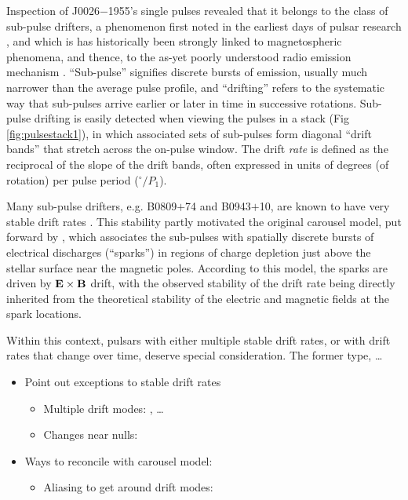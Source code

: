 \documentclass[twocolumn]{aastex631}
\newcommand{\psr}{J0026$-$1955}
\newcommand{\ExB}{\ensuremath{{\bf E}\times{\bf B}}}
\begin{document}
Inspection of \psr{}'s single pulses revealed that it belongs to the class of sub-pulse drifters, a phenomenon first noted in the earliest days of pulsar research \citep{Drake1968}, and which is has historically been strongly linked to magnetospheric phenomena, and thence, to the as-yet poorly understood radio emission mechanism \citep{Ruderman1975,Rankin1986,Deshpande1999}.
``Sub-pulse'' signifies discrete bursts of emission, usually much narrower than the average pulse profile, and ``drifting'' refers to the systematic way that sub-pulses arrive earlier or later in time in successive rotations.
Sub-pulse drifting is easily detected when viewing the pulses in a stack (Fig \ref{fig:pulsestack1}), in which associated sets of sub-pulses form diagonal ``drift bands'' that stretch across the on-pulse window.
The drift \textit{rate} is defined as the reciprocal of the slope of the drift bands, often expressed in units of degrees (of rotation) per pulse period ($^\circ/P_1$).

Many sub-pulse drifters, e.g. B0809$+$74 and B0943$+$10, are known to have very stable drift rates \citep[e.g.][]{Taylor1971,Deshpande1999}.
This stability partly motivated the original carousel model, put forward by \citet{Ruderman1975}, which associates the sub-pulses with spatially discrete bursts of electrical discharges (``sparks'') in regions of charge depletion just above the stellar surface near the magnetic poles.
According to this model, the sparks are driven by \ExB{} drift, with the observed stability of the drift rate being directly inherited from the theoretical stability of the electric and magnetic fields at the spark locations.

Within this context, pulsars with either multiple stable drift rates, or with drift rates that change over time, deserve special consideration.
The former type, \dots

\begin{itemize}
    \item Point out exceptions to stable drift rates
    \begin{itemize}
        \item Multiple drift modes: \citep{Hankins1987}, \dots
        \item Changes near nulls: \citep{Lyne1983,VanLeeuwen2002,VanLeeuwen2003}
    \end{itemize}
    \item Ways to reconcile with carousel model:
    \begin{itemize}
        \item Aliasing to get around drift modes: \citep{Rankin2013,McSweeney2019a}
    \end{itemize}
\end{itemize}
\end{document}
